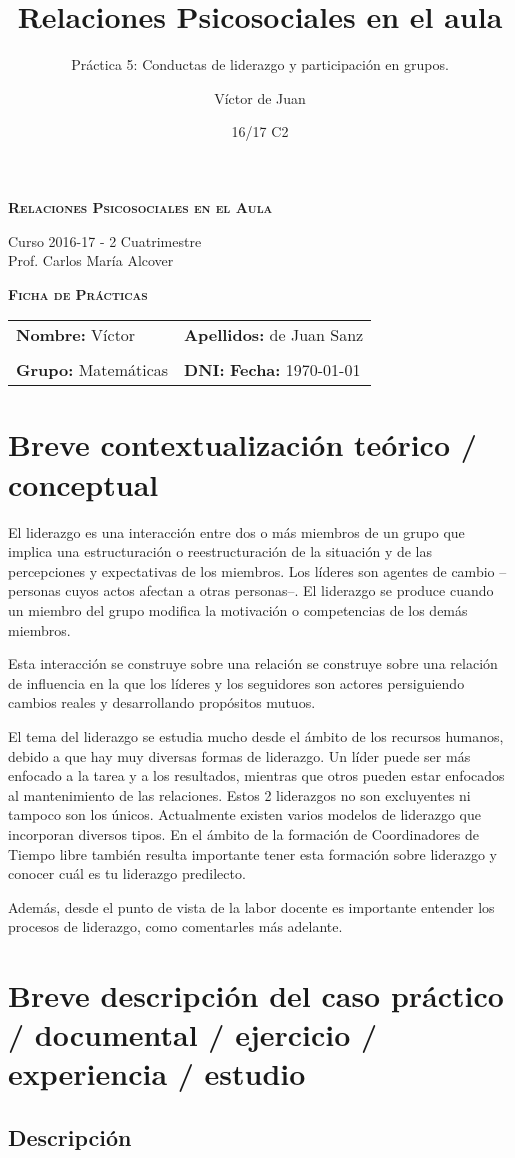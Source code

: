 \documentclass[palatino,nochap]{apuntesURJC}
\title{Relaciones Psicosociales en el aula}
\subtitle{Práctica 5: Conductas de liderazgo y participación en grupos.}
\author{Víctor de Juan}
\date{16/17 C2}
\newcommand{\makeheader}[1]{
\begin{center}
\Large \textbf{\textsc{Relaciones Psicosociales en el Aula}}\\
\end{center}
\begin{center}
\large Curso 2016-17 - 2 Cuatrimestre\\
Prof. Carlos María Alcover
\end{center}

\begin{center}
\Large \textbf{\textsc{Ficha de Prácticas}}
\end{center}

\begin{center}
\begin{tabular}{ll}
\hspace{2cm}\textbf{Nombre:} Víctor &  \hspace{1.5cm} \textbf{Apellidos:} de Juan Sanz\\
\vspace{0.3cm}&\\
\textbf{Grupo:} Matemáticas 	& \textbf{DNI:} %
 \hspace{3cm} \textbf{Fecha:} #1
\end{tabular}
\end{center}
}
\begin{document}
\pagestyle{plain}
\maketitle

\makeheader{\today}

\section{Breve contextualización teórico / conceptual}
\label{intro}

\begin{defn}[Liderazgo]
El liderazgo es una interacción entre dos o más
miembros de un grupo que implica una
estructuración o reestructuración de la situación y
de las percepciones y expectativas de los miembros.
Los líderes son agentes de cambio –personas cuyos
actos afectan a otras personas–. El liderazgo se
produce cuando un miembro del grupo modifica la
motivación o competencias de los demás
miembros.
\end{defn}

Esta interacción se construye sobre una relación se construye sobre una relación de influencia en la que los líderes y los seguidores son actores persiguiendo cambios reales y desarrollando propósitos mutuos.

El tema del liderazgo se estudia mucho desde el ámbito de los recursos humanos, debido a que hay muy diversas formas de liderazgo.
%
Un líder puede ser más enfocado a la tarea y a los resultados, mientras que otros pueden estar enfocados al mantenimiento de las relaciones.
%
Estos 2 liderazgos no son excluyentes ni tampoco son los únicos.
%
Actualmente existen varios modelos de liderazgo que incorporan diversos tipos.
%
En el ámbito de la formación de Coordinadores de Tiempo libre también resulta importante tener esta formación sobre liderazgo y conocer cuál es tu liderazgo predilecto.

Además, desde el punto de vista de la labor docente es importante entender los procesos de liderazgo, como comentarles más adelante.


\section{Breve descripción del caso práctico / documental / ejercicio / experiencia / estudio}

\subsection{Descripción}
\end{document}
